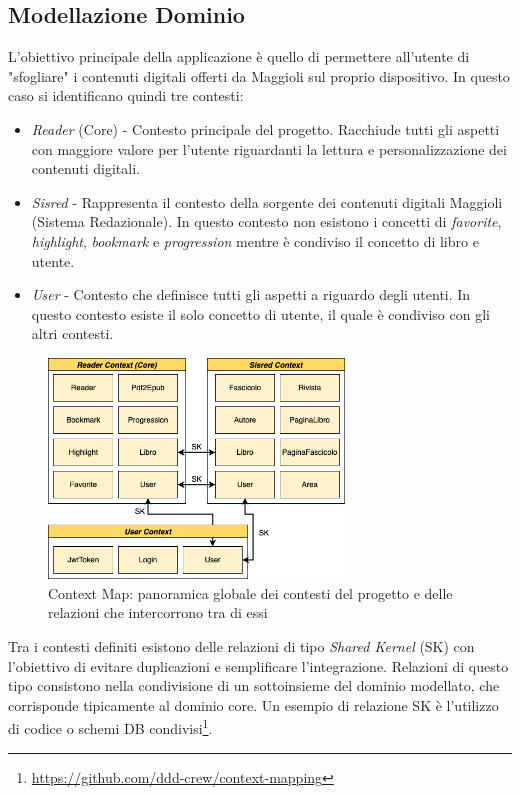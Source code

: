 \subsection{Modellazione Dominio}

L'obiettivo principale della applicazione è quello di permettere all'utente di "sfogliare" i contenuti digitali offerti da Maggioli sul proprio dispositivo. In questo caso si identificano quindi tre contesti:

\begin{itemize}
    \item \textit{Reader} (Core) - Contesto principale del progetto. Racchiude tutti gli aspetti con maggiore valore per l'utente riguardanti la lettura e personalizzazione dei contenuti digitali. 
    \item \textit{Sisred} - Rappresenta il contesto della sorgente dei contenuti digitali Maggioli (Sistema Redazionale\cite{amslaurea23043}). In questo contesto non esistono i concetti di \textit{favorite}, \textit{highlight}, \textit{bookmark} e \textit{progression} mentre è condiviso il concetto di libro e utente.
    \item \textit{User} - Contesto che definisce tutti gli aspetti a riguardo degli utenti. In questo contesto esiste il solo concetto di utente, il quale è condiviso con gli altri contesti.
\end{itemize}

\begin{figure}[H]
\centering
\includegraphics[width=0.7\textwidth]{img/tesi-20-app-domain.drawio.png}
\caption{Context Map: panoramica globale dei contesti del progetto e delle relazioni che intercorrono tra di essi}
\end{figure}

Tra i contesti definiti esistono delle relazioni di tipo \textit{Shared Kernel}\cite{evans_domain-driven_2004} (SK) con l'obiettivo di evitare duplicazioni e semplificare l'integrazione. Relazioni di questo tipo consistono nella condivisione di un sottoinsieme del dominio modellato, che corrisponde tipicamente al dominio core. Un esempio di relazione SK è l'utilizzo di codice o schemi DB condivisi\footnote{\url{https://github.com/ddd-crew/context-mapping}}.\\

